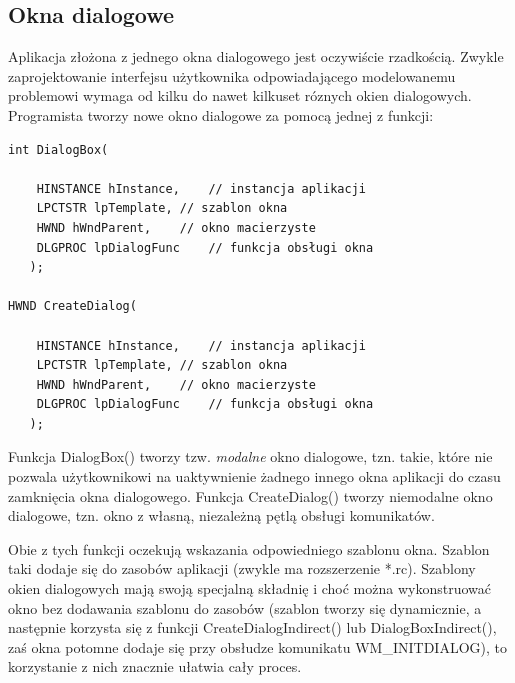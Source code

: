 \subsection{Okna dialogowe}

Aplikacja złożona z jednego okna dialogowego jest oczywiście rzadkością. Zwykle zaprojektowanie
interfejsu użytkownika odpowiadającego modelowanemu problemowi wymaga od kilku do nawet kilkuset
róznych okien dialogowych. Programista tworzy nowe okno dialogowe za pomocą jednej z funkcji:

\begin{scriptsize}
\begin{verbatim}
int DialogBox(

    HINSTANCE hInstance,	// instancja aplikacji
    LPCTSTR lpTemplate,	// szablon okna
    HWND hWndParent,	// okno macierzyste
    DLGPROC lpDialogFunc 	// funkcja obsługi okna
   );	

HWND CreateDialog(

    HINSTANCE hInstance,	// instancja aplikacji
    LPCTSTR lpTemplate,	// szablon okna
    HWND hWndParent,	// okno macierzyste
    DLGPROC lpDialogFunc 	// funkcja obsługi okna
   );
\end{verbatim}
\end{scriptsize}

Funkcja DialogBox() tworzy tzw. {\em modalne} okno dialogowe, tzn. takie, które nie pozwala
użytkownikowi na uaktywnienie żadnego innego okna aplikacji do czasu zamknięcia okna dialogowego.
Funkcja CreateDialog() tworzy niemodalne okno dialogowe, tzn. okno z własną, niezależną pętlą obsługi 
komunikatów.

Obie z tych funkcji oczekują wskazania odpowiedniego szablonu okna. Szablon taki dodaje się do
zasobów aplikacji (zwykle ma rozszerzenie *.rc). Szablony okien dialogowych mają swoją specjalną składnię i
choć można wykonstruować okno bez dodawania szablonu do zasobów (szablon tworzy się dynamicznie, a następnie
korzysta się z funkcji CreateDialogIndirect() lub DialogBoxIndirect(), zaś okna potomne dodaje się 
przy obsłudze komunikatu WM\_INITDIALOG), to korzystanie z nich znacznie ułatwia cały proces.

